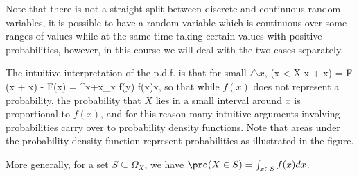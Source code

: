 Note that there is not a straight split between discrete and continuous random variables, it is possible to have a random variable which is continuous over some ranges of values while at the same time taking certain values with positive probabilities, however, in this course we will deal with the two cases separately. 

The intuitive interpretation of the p.d.f. is that for small $\triangle x$,
\be
\pro(x < X \leq x + \triangle x) = F (x + \triangle x) - F(x) = \int^{x+\triangle x}_x f(y) \approx f(x)\triangle x,
\ee
so that while $f(x)$ does not represent a probability, the probability that $X$ lies in a small interval around $x$ is proportional to $f(x)$, and for this reason many intuitive arguments involving probabilities carry over to probability density functions. Note that areas under the probability density function represent probabilities as illustrated in the figure.


More generally, for a set $S \subseteq \Omega_X$, we have $\pro(X \in S) = \int_{x\in S} f(x)dx$.
\een
